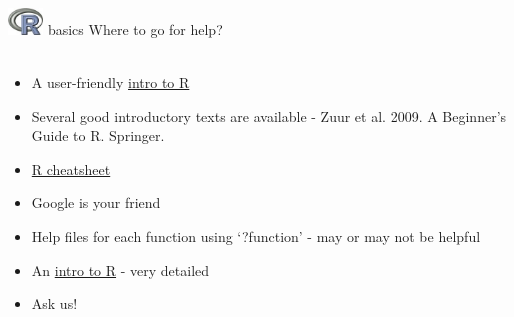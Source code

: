 \documentclass[xcolor=svgnames]{beamer}
\begin{document}

\begin{frame}[t,fragile]{\includegraphics[width=0.07\textwidth]{Rlogo.jpg} \hspace{0.01in} basics}
Where to go for help?\\~\\
\begin{itemize}
\addtolength{\itemsep}{0.08in}
\item A user-friendly \href{http://www.statmethods.net/}{intro to R} 
\item Several good introductory texts are available - Zuur et al. 2009. A Beginner's Guide to R. Springer.
\item \href{http://cran.r-project.org/doc/contrib/Short-refcard.pdf}{R cheatsheet}
\item Google is your friend 
\item Help files for each function using `?function' - may or may not be helpful 
\item An \href{http://cran.r-project.org/doc/manuals/R-intro.html}{intro to R} - very detailed
\item Ask us!
\end{itemize}
\end{frame}

% 
% 
\end{document}
